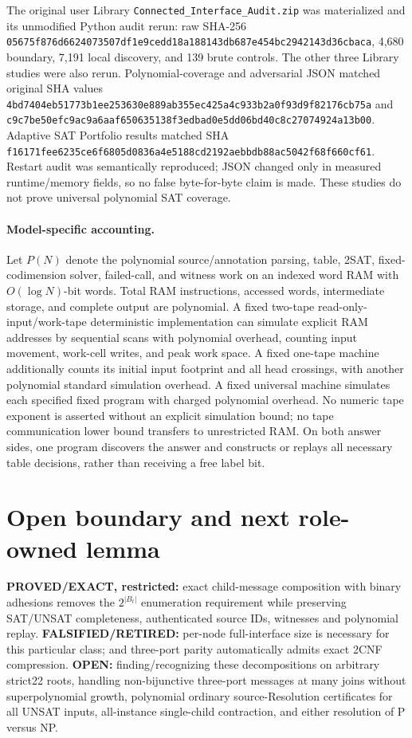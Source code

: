 \documentclass[11pt]{article}
\begin{document}
The original user Library \texttt{Connected\_Interface\_Audit.zip} was
materialized and its unmodified Python audit rerun: raw SHA-256
\texttt{05675f876d6624073507df1e9cedd18a188143db687e454bc2942143d36cbaca},
4,680 boundary, 7,191 local discovery, and 139 brute controls. The other
three Library studies were also rerun. Polynomial-coverage and adversarial
JSON matched original SHA values
\texttt{4bd7404eb51773b1ee253630e889ab355ec425a4c933b2a0f93d9f82176cb75a}
and \texttt{c9c7be50efc9ac9a6aaf650635138f3edbad0e5dd06bd40c8c27074924a13b00}.
Adaptive SAT Portfolio results matched SHA
\texttt{f16171fee6235ce6f6805d0836a4e5188cd2192aebbdb88ac5042f68f660cf61}.
Restart audit was semantically reproduced; JSON changed only in measured
runtime/memory fields, so no false byte-for-byte claim is made. These
studies do not prove universal polynomial SAT coverage.

\paragraph{Model-specific accounting.}
Let $P(N)$ denote the polynomial source/annotation parsing, table, 2SAT,
fixed-codimension solver, failed-call, and witness work on an indexed word RAM
with $O(\log N)$-bit words. Total RAM instructions, accessed words,
intermediate storage, and complete output are polynomial. A fixed two-tape
read-only-input/work-tape deterministic implementation can simulate explicit
RAM addresses by sequential scans with polynomial overhead, counting input
movement, work-cell writes, and peak work space. A fixed one-tape machine
additionally counts its initial input footprint and all head crossings, with
another polynomial standard simulation overhead. A fixed universal machine
simulates each specified fixed program with charged polynomial overhead.
No numeric tape exponent is asserted without an explicit simulation bound;
no tape communication lower bound transfers to unrestricted RAM. On both
answer sides, one program discovers the answer and constructs or replays
all necessary table decisions, rather than receiving a free label bit.

\section{Open boundary and next role-owned lemma}
\textbf{PROVED/EXACT, restricted:} exact child-message composition with binary
adhesions removes the $2^{|B_t|}$ enumeration requirement while preserving
SAT/UNSAT completeness, authenticated source IDs, witnesses and
polynomial replay. \textbf{FALSIFIED/RETIRED:} per-node full-interface size
is necessary for this particular class; and three-port parity automatically
admits exact 2CNF compression. \textbf{OPEN:} finding/recognizing these
decompositions on arbitrary strict22 roots, handling non-bijunctive
three-port messages at many joins without superpolynomial growth, polynomial
ordinary source-Resolution certificates for all UNSAT inputs, all-instance
single-child contraction, and either resolution of P versus NP.
\end{document}
